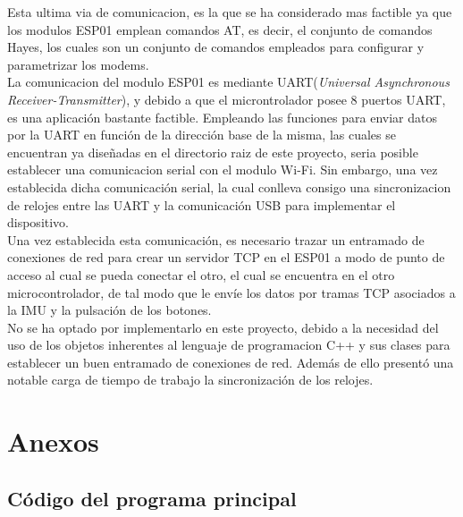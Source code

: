 \documentclass[a4paper,twoside]{article}
\begin{document}
Esta ultima via de comunicacion, es la que se ha considerado mas factible ya que los modulos ESP01 emplean comandos AT, es decir, el conjunto de comandos Hayes, los cuales son un conjunto de comandos empleados para configurar y parametrizar los modems. \\
La comunicacion del modulo ESP01 es mediante UART(\textit{Universal Asynchronous Receiver-Transmitter}), y debido a que el microntrolador posee 8 puertos UART, es una aplicación bastante factible. Empleando las funciones para enviar datos por la UART en función de la dirección base de la misma, las cuales se encuentran ya diseñadas en el directorio raiz de este proyecto, seria posible establecer una comunicacion serial con el modulo Wi-Fi. Sin embargo, una vez establecida dicha comunicación serial, la cual conlleva consigo una sincronizacion de relojes entre las UART y la comunicación USB para implementar el dispositivo. \\
Una vez establecida esta comunicación, es necesario trazar un entramado de conexiones de red para crear un servidor TCP en el ESP01 a modo de punto de acceso al cual se pueda conectar el otro, el cual se encuentra en el otro microcontrolador, de tal modo que le envíe los datos por tramas TCP asociados a la IMU y la pulsación de los botones.\\

No se ha optado por implementarlo en este proyecto, debido a la necesidad del uso de los objetos inherentes al lenguaje de programacion C++ y sus clases para establecer un buen entramado de conexiones de red. Además de ello presentó una notable carga de tiempo de trabajo la sincronización de los relojes. \\

\newpage
\section{Anexos}
\subsection{Código del programa principal}
\begin{mdframed}[linecolor=black, topline=false, bottomline=false, leftline=false, rightline=false]
\inputminted[linenos,breaklines,frame=lines,framesep=2mm]{c}{codes/main.c}
\end{mdframed}
\end{document}
